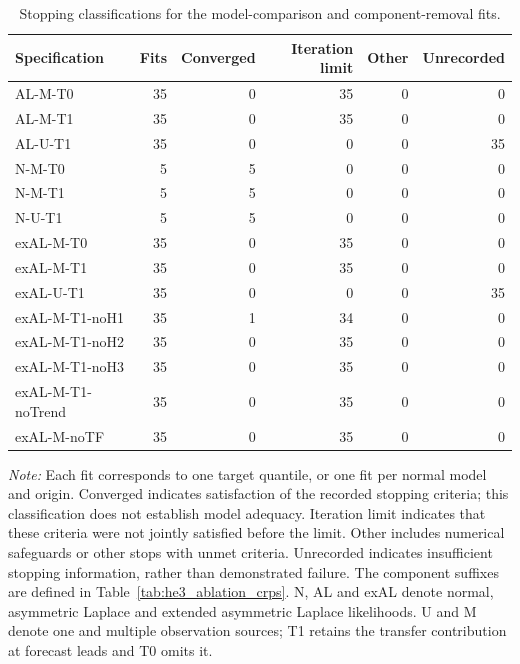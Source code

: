 \begin{table}[!htbp]
\centering
\begin{threeparttable}
\caption{Stopping classifications for the model-comparison and component-removal fits.}
\label{tab:comment2_fit_diagnostics}
\fontsize{8.5}{10.5}\selectfont
\begin{tabular}{lrrrrr}
\hline
Specification & Fits & Converged & Iteration limit & Other & Unrecorded \\
\hline
AL-M-T0 & 35 & 0 & 35 & 0 & 0 \\
AL-M-T1 & 35 & 0 & 35 & 0 & 0 \\
AL-U-T1 & 35 & 0 & 0 & 0 & 35 \\
N-M-T0 & 5 & 5 & 0 & 0 & 0 \\
N-M-T1 & 5 & 5 & 0 & 0 & 0 \\
N-U-T1 & 5 & 5 & 0 & 0 & 0 \\
exAL-M-T0 & 35 & 0 & 35 & 0 & 0 \\
exAL-M-T1 & 35 & 0 & 35 & 0 & 0 \\
exAL-U-T1 & 35 & 0 & 0 & 0 & 35 \\
exAL-M-T1-noH1 & 35 & 1 & 34 & 0 & 0 \\
exAL-M-T1-noH2 & 35 & 0 & 35 & 0 & 0 \\
exAL-M-T1-noH3 & 35 & 0 & 35 & 0 & 0 \\
exAL-M-T1-noTrend & 35 & 0 & 35 & 0 & 0 \\
exAL-M-noTF & 35 & 0 & 35 & 0 & 0 \\
\hline
\end{tabular}
\begin{tablenotes}
\fontsize{8}{10}\selectfont
\item \textit{Note:} Each fit corresponds to one target quantile, or one fit per normal model and origin. Converged indicates satisfaction of the recorded stopping criteria; this classification does not establish model adequacy. Iteration limit indicates that these criteria were not jointly satisfied before the limit. Other includes numerical safeguards or other stops with unmet criteria. Unrecorded indicates insufficient stopping information, rather than demonstrated failure. The component suffixes are defined in Table~\ref{tab:he3_ablation_crps}. N, AL and exAL denote normal, asymmetric Laplace and extended asymmetric Laplace likelihoods. U and M denote one and multiple observation sources; T1 retains the transfer contribution at forecast leads and T0 omits it.
\end{tablenotes}
\end{threeparttable}
\end{table}
